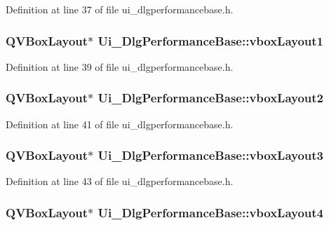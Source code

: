 Definition at line 37 of file ui\+\_\+dlgperformancebase.\+h.

\hypertarget{classUi__DlgPerformanceBase_a39bb4caf4acbc4131727a12ec7bff223}{
\subsubsection[{vbox\+Layout1}]{\setlength{\rightskip}{0pt plus 5cm}Q\+V\+Box\+Layout$\ast$ Ui\+\_\+\+Dlg\+Performance\+Base\+::vbox\+Layout1}}\label{classUi__DlgPerformanceBase_a39bb4caf4acbc4131727a12ec7bff223}


Definition at line 39 of file ui\+\_\+dlgperformancebase.\+h.

\hypertarget{classUi__DlgPerformanceBase_a7daf9953a4d7a2ceebaac14b9e556d40}{
\subsubsection[{vbox\+Layout2}]{\setlength{\rightskip}{0pt plus 5cm}Q\+V\+Box\+Layout$\ast$ Ui\+\_\+\+Dlg\+Performance\+Base\+::vbox\+Layout2}}\label{classUi__DlgPerformanceBase_a7daf9953a4d7a2ceebaac14b9e556d40}


Definition at line 41 of file ui\+\_\+dlgperformancebase.\+h.

\hypertarget{classUi__DlgPerformanceBase_a353ef6aa2acdcffede6a00356a036484}{
\subsubsection[{vbox\+Layout3}]{\setlength{\rightskip}{0pt plus 5cm}Q\+V\+Box\+Layout$\ast$ Ui\+\_\+\+Dlg\+Performance\+Base\+::vbox\+Layout3}}\label{classUi__DlgPerformanceBase_a353ef6aa2acdcffede6a00356a036484}


Definition at line 43 of file ui\+\_\+dlgperformancebase.\+h.

\hypertarget{classUi__DlgPerformanceBase_a8cc54ee3f49d72f579529a8c662a83d7}{
\subsubsection[{vbox\+Layout4}]{\setlength{\rightskip}{0pt plus 5cm}Q\+V\+Box\+Layout$\ast$ Ui\+\_\+\+Dlg\+Performance\+Base\+::vbox\+Layout4}}\label{classUi__DlgPerformanceBase_a8cc54ee3f49d72f579529a8c662a83d7}



